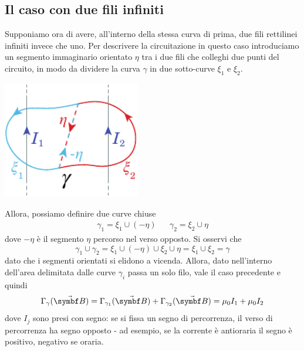 \subsection{Il caso con due fili infiniti}
Supponiamo ora di avere, all'interno della stessa curva di prima, due fili rettilinei infiniti invece che uno. Per descrivere la circuitazione in questo caso introduciamo un segmento immaginario orientato $\eta$ tra i due fili che colleghi due punti del circuito, in modo da dividere la curva $\gamma$ in due sotto-curve $\xi_1$ e $\xi_2$.
\begin{center}
	\includegraphics[width=0.45\textwidth]{images/chp9/chp9leggeampere2.pdf}
\end{center}
Allora, possiamo definire due curve chiuse
\begin{align*}
	\gamma_1=\xi_1 \cup \left(-\eta\right)&&\gamma_2=\xi_2\cup \eta 
\end{align*} 
dove $-\eta$ è il segmento $\eta$ percorso nel verso opposto. Si osservi che
\begin{equation*}
	\gamma_1\cup\gamma_2=\xi_1\cup \left(-\eta\right)\cup \xi_2\cup \eta=\xi_1\cup \xi_2=\gamma
\end{equation*}
dato che i segmenti orientati si elidono a vicenda. Allora, dato nell'interno dell'area delimitata dalle curve $\gamma_i$ passa un solo filo, vale il caso precedente e quindi 
\begin{equation}
	\Gamma_{\gamma}(\vba{B})=\Gamma_{\gamma_1}(\vba{B})+\Gamma_{\gamma_2}(\vba{B})=\mu_0 I_1+\mu_0I_2
\end{equation}
dove $I_j$ sono presi con segno: se si fissa un segno di percorrenza, il verso di percorrenza ha segno opposto - ad esempio, se la corrente è antioraria il segno è positivo, negativo se oraria.
